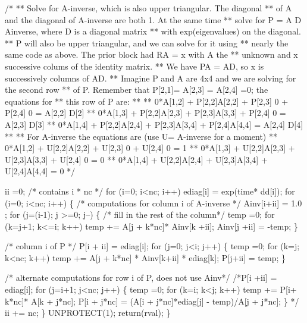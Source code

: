 \documentclass{article}
\begin{document}
\begin{nwchunk}
     /*
     ** Solve for A-inverse, which is also upper triangular. The diagonal
     **  of A and the diagonal of A-inverse are both 1.  At the same time 
     **  solve for P = A D Ainverse, where D is a diagonal matrix 
     **  with exp(eigenvalues) on the diagonal.
     ** P will also be upper triangular, and we can solve for it using
     **  nearly the same code as above.  The prior block had RA = x with A the
     **  unknown and x successive colums of the identity matrix. 
     **  We have PA = AD, so x is successively columns of AD.
     ** Imagine P and A are 4x4 and we are solving for the second row
     **  of P.  Remember that P[2,1]= A[2,3] = A[2,4] =0; the equations for
     **  this row of P are:
     **
     **    0*A[1,2] + P[2,2]A[2,2] + P[2,3] 0     + P[2,4] 0     = A[2,2] D[2]
     **    0*A[1,3] + P[2,2]A[2,3] + P[2,3]A[3,3] + P[2,4] 0     = A[2,3] D[3]
     **    0*A[1,4] + P[2,2]A[2,4] + P[2,3]A[3,4] + P[2,4]A[4,4] = A[2,4] D[4]
     **
     **  For A-inverse the equations are (use U= A-inverse for a moment)
     **    0*A[1,2] + U[2,2]A[2,2] + U[2,3] 0     + U[2,4] 0     = 1
     **    0*A[1,3] + U[2,2]A[2,3] + U[2,3]A[3,3] + U[2,4] 0     = 0
     **    0*A[1,4] + U[2,2]A[2,4] + U[2,3]A[3,4] + U[2,4]A[4,4] = 0
     */
     
     ii =0; /* contains i * nc */
     for (i=0; i<nc; i++) ediag[i] = exp(time* dd[i]);
     for (i=0; i<nc; i++) \{ 
         /* computations for column i of A-inverse */
         Ainv[i+ii] = 1.0 ;
         for (j=(i-1); j >=0; j--) \{  /* fill in the rest of the column*/
             temp =0;
             for (k=j+1; k<=i; k++) temp += A[j + k*nc]* Ainv[k +ii];
             Ainv[j +ii] = -temp;
         \}
         
         /* column i of P */
         P[i + ii] = ediag[i];
         for (j=0; j<i; j++) \{
             temp =0;
             for (k=j; k<nc; k++) temp += A[j + k*nc] * Ainv[k+ii] * ediag[k];
             P[j+ii] = temp;
         \}
         
         /* alternate computations for row i of P, does not use Ainv*/
         /*P[i +ii] = ediag[i];
           for (j=i+1; j<nc; j++) \{ 
               temp =0;
               for (k=i; k<j; k++) temp += P[i+ k*nc]* A[k + j*nc];
               P[i + j*nc] = (A[i + j*nc]*ediag[j] - temp)/A[j + j*nc];
           \} 
         */
         ii += nc;
     \}
     UNPROTECT(1);
     return(rval);
 \}
\end{nwchunk}
\end{document}
